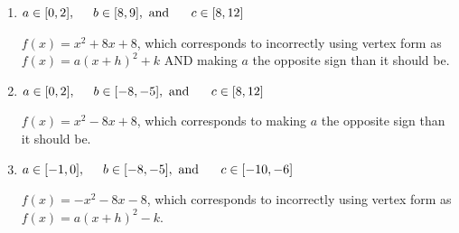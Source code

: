 \documentclass{extbook}[14pt]
\begin{document}
\begin{enumerate}
{\begin{enumerate}[label=\Alph*.]
$f(x)=-x^{2} -8 x -24$, which corresponds to incorrectly using vertex form as $f(x) = a(x+h)^2+k$.
\item \( a \in [0, 2], \hspace*{5mm} b \in [8, 9], \text{ and } \hspace*{5mm} c \in [8, 12] \)

$f(x)=x^{2} +8 x + 8$, which corresponds to incorrectly using vertex form as $f(x) = a(x+h)^2+k$ AND making $a$ the opposite sign than it should be.
\item \( a \in [0, 2], \hspace*{5mm} b \in [-8, -5], \text{ and } \hspace*{5mm} c \in [8, 12] \)

$f(x)=x^{2} -8 x + 8$, which corresponds to making $a$ the opposite sign than it should be.
\item \( a \in [-1, 0], \hspace*{5mm} b \in [-8, -5], \text{ and } \hspace*{5mm} c \in [-10, -6] \)

$f(x)=-x^{2} -8 x -8$, which corresponds to incorrectly using vertex form as $f(x) = a(x+h)^2 - k$.
\end{enumerate}

}
\end{enumerate}
\end{document}
